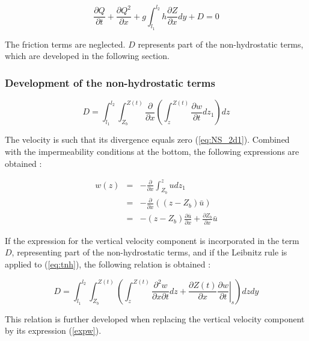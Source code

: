 \begin{equation}
\frac{\partial{Q}}{\partial{t}}+\frac{\partial{Q^{2}}}{\partial{x}}+g\int_{l_{1}}^{l_{2}}h\frac{\partial{Z}}{\partial{x}}dy+D =0
\label{eq:mod_cont}
\end{equation}

The friction terms are neglected. $D$ represents part of the non-hydrostatic terms, which are developed in the following section.

\subsubsection{Development of the non-hydrostatic terms}

\begin{equation}
D=\int_{l_{1}}^{l_{2}}\int_{Z_{b}}^{Z(t)}{\frac{\partial}{\partial{x}}}\left(\int_{z}^{Z(t)}{\frac{\partial{w}}{\partial{t}}dz_{1}}\right)dz
\label{eq:tnh}
\end{equation}

The velocity is such that its divergence equals zero (\ref{eq:NS_2d1}). Combined with the impermeability conditions at the bottom, the following expressions are obtained :

\begin{eqnarray}
w(z) & = & - \frac{\partial}{\partial{x}}\int_{Z_{b}}^{z}udz_1\\
     & = & - \frac{\partial}{\partial{x}}((z-Z_{b})\bar{u})\\
     & = & -(z-Z_{b})\frac{\partial{\bar{u}}}{\partial{x}}+\frac{\partial{Z_b}}{\partial{x}}\bar{u}
\label{expw}
\end{eqnarray}

If the expression for the vertical velocity component is incorporated in the term $D$, representing part of the non-hydrostatic terms, and if the Leibnitz rule is applied to (\ref{eq:tnh}), the following relation is obtained :

\begin{equation}
  D =\int_{l_{1}}^{l_{2}}\int_{Z_{b}}^{Z(t)}\left(\int_{z}^{Z(t)}\frac{\partial^2{w}}{\partial{x}\partial{t}}dz+\left.\frac{\partial{Z(t)}}{\partial{x}}\frac{\partial{w}}{\partial{t}}\right|_s\right)dzdy
\end{equation}

This relation is further developed when replacing the vertical velocity component by its expression (\ref{expw}).

